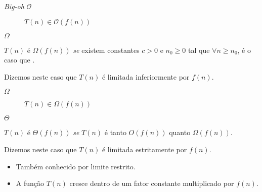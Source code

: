 \documentclass[
    mode=present,
    style=dvn,
    paper=screen,
    display=slidesnotes,
    size=14pt,
]{powerdot}
\begin{document}
\begin{slide}{\textit{Big-oh} $\mathcal{O}$}

    \begin{figure}
        
        \caption{$T(n){\in}\mathcal{O}(f(n))$}
    \end{figure}
\end{slide}

\begin{slide}{$\Omega$}
    \begin{defn}
         $T(n)$ é $\Omega(f(n))$ \textit{se} existem constantes $c>0$ e $n_0 \geq 0$ tal que $\forall n \geq n_0$, é o caso que .\pause
    \end{defn}
    Dizemos neste caso que $T(n)$ é limitada inferiormente por $f(n)$.
    \bigskip
{}
\end{slide}

\begin{slide}{$\Omega$}
    \begin{figure}
        
        \caption{$T(n){\in}\Omega(f(n))$}
    \end{figure}
\end{slide}


\begin{slide}{$\Theta$}
    \begin{defn}
         $T(n)$ é $\Theta(f(n))$ \textit{se} $T(n)$ é tanto $O(f(n))$ quanto $\Omega(f(n))$.\pause
    \end{defn}
    Dizemos neste caso que $T(n)$ é limitada estritamente por $f(n)$.\pause

    \begin{itemize}
        \item Também conhecido por limite restrito.
        \item A função $T(n)$ cresce dentro de um fator constante multiplicado por $f(n)$.
    \end{itemize}
\end{slide}
\end{document}
